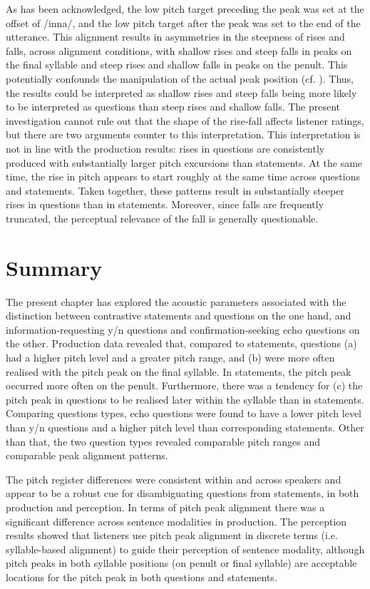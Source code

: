 As has been acknowledged, the low pitch target preceding the peak was set at the offset of /inna/, and the low pitch target after the peak was set to the end of the utterance. This alignment results in asymmetries in the steepness of rises and falls, across alignment conditions, with shallow rises and steep falls in peaks on the final syllable and steep rises and shallow falls in peaks on the penult. This potentially confounds the manipulation of the actual peak position (cf. ). Thus, the results could be interpreted as shallow rises and steep falls being more likely to be interpreted as questions than steep rises and shallow falls. The present investigation cannot rule out that the shape of the rise-fall affects listener ratings, but there are two arguments counter to this interpretation. This interpretation is not in line with the production results: rises in questions are consistently produced with substantially larger pitch excursions than statements. At the same time, the rise in pitch appears to start roughly at the same time across questions and statements. Taken together, these patterns result in substantially steeper rises in questions than in statements. Moreover, since falls are frequently truncated, the perceptual relevance of the fall is generally questionable.

\largerpage
\section{Summary}\label{sec:5.7}
The present chapter has explored the acoustic parameters associated with the distinction between contrastive statements and questions on the one hand, and information-requesting y/n questions and confirmation-seeking echo questions on the other. Production data revealed that, compared to statements, questions (a) had a higher pitch level and a greater pitch range, and (b) were more often realised with the pitch peak on the final syllable. In statements, the pitch peak occurred more often on the penult. Furthermore, there was a tendency for (c) the pitch peak in questions to be realised later within the syllable than in statements. Comparing questions types, echo questions were found to have a lower pitch level than y/n questions and a higher pitch level than corresponding statements. Other than that, the two question types revealed comparable pitch ranges and comparable peak alignment patterns.

The pitch register differences were consistent within and across speakers and appear to be a robust cue for disambiguating questions from statements, in both production and perception. In terms of pitch peak alignment there was a significant difference across sentence modalities in production. The perception results showed that listeners use pitch peak alignment in discrete terms (i.e. syllable-based alignment) to guide their perception of sentence modality, although pitch peaks in both syllable positions (on penult or final syllable) are acceptable locations for the pitch peak in both questions and statements. 

